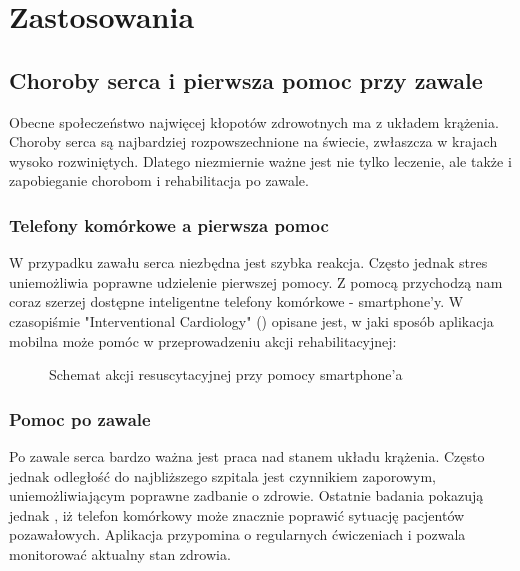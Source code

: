 \chapter{Zastosowania}
\label{cha:zastosowania}

\section{Choroby serca i pierwsza pomoc przy zawale}

Obecne społeczeństwo najwięcej kłopotów zdrowotnych ma z układem krążenia. Choroby serca są najbardziej rozpowszechnione na świecie, zwłaszcza w krajach wysoko rozwiniętych. Dlatego niezmiernie ważne jest nie tylko leczenie, ale także i zapobieganie chorobom i rehabilitacja po zawale.
\subsection{Telefony komórkowe a pierwsza pomoc}

W przypadku zawału serca niezbędna jest szybka reakcja. Często jednak stres uniemożliwia poprawne udzielenie pierwszej pomocy. Z pomocą przychodzą nam coraz szerzej dostępne inteligentne telefony komórkowe - smartphone'y. W czasopiśmie "Interventional Cardiology" (\cite{ICHoneyman2014Mobilehealthapplicationsincardiaccare}) opisane jest, w jaki sposób aplikacja mobilna może pomóc w przeprowadzeniu akcji rehabilitacyjnej:
\begin{figure}[ht!]
  \centering
  \caption{Schemat akcji resuscytacyjnej przy pomocy smartphone'a}
\end{figure}

\subsection{Pomoc po zawale}

Po zawale serca bardzo ważna jest praca nad stanem układu krążenia. Często jednak odległość do najbliższego szpitala jest czynnikiem zaporowym, uniemożliwiającym poprawne zadbanie o zdrowie. Ostatnie badania pokazują jednak \cite{FMottl2014Smartphoneappprovesvaluableforcardiacpatients}, iż telefon komórkowy może znacznie poprawić sytuację pacjentów pozawałowych. Aplikacja przypomina o regularnych ćwiczeniach i pozwala monitorować aktualny stan zdrowia.
